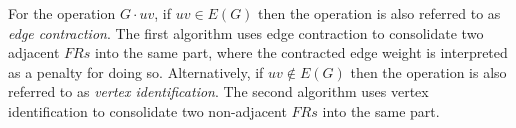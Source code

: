 For the operation \(G\cdot uv\), if \(uv\in E(G)\) then the operation is also referred to as \emph{edge
  contraction}.  The first algorithm uses edge contraction to consolidate two adjacent \(FRs\) into the same part,
where the contracted edge weight is interpreted as a penalty for doing so.  Alternatively, if \(uv\notin E(G)\)
then the operation is also referred to as \emph{vertex identification}.  The second algorithm uses vertex
identification to consolidate two non-adjacent \(FRs\) into the same part.
